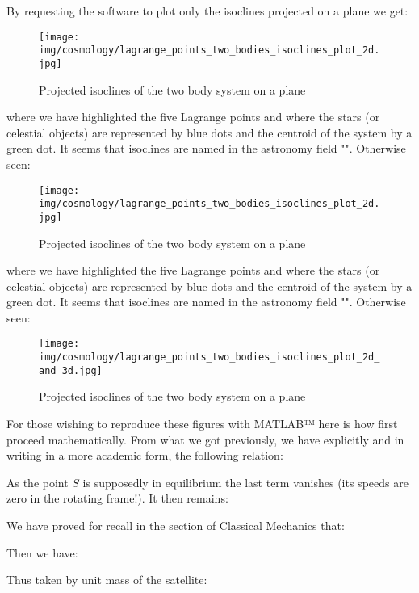 	By requesting the software to plot only the isoclines projected on a plane we get:
	\begin{figure}[H]
		\centering
		\texttt{[image: img/cosmology/lagrange\_points\_two\_bodies\_isoclines\_plot\_2d.jpg]}	
		\caption{Projected isoclines of the two body system on a plane}
	\end{figure}
	where we have highlighted the five Lagrange points and where the stars (or celestial objects) are represented by blue dots and the centroid of the system by a green dot. It seems that isoclines are named in the astronomy field "". Otherwise seen:
	\begin{figure}[H]
		\texttt{[image: img/cosmology/lagrange\_points\_two\_bodies\_isoclines\_plot\_2d.jpg]}	
		\caption[]{Projected isoclines of the two body system on a plane}
	\end{figure}
	where we have highlighted the five Lagrange points and where the stars (or celestial objects) are represented by blue dots and the centroid of the system by a green dot. It seems that isoclines are named in the astronomy field "". Otherwise seen:
	\begin{figure}[H]
		\centering
		\texttt{[image: img/cosmology/lagrange\_points\_two\_bodies\_isoclines\_plot\_2d\_and\_3d.jpg]}	
		\caption[]{Projected isoclines of the two body system on a plane}
	\end{figure}
	For those wishing to reproduce these figures with MATLAB™ here is how first proceed mathematically. From what we got previously, we have explicitly and in writing in a more academic form, the following relation:
	
	As the point $S$ is supposedly in equilibrium the last term vanishes (its speeds are zero in the rotating frame!). It then remains:
	
	We have proved for recall in the section of Classical Mechanics that:
	
	Then we have:
	
	Thus taken by unit mass of the satellite:
	

